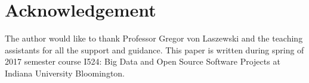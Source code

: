 \documentclass[9pt,twocolumn,twoside]{styles/osajnl}
\begin{document}
\section{Acknowledgement}
The author would like to thank Professor Gregor von Laszewski and the
teaching assistants for all the support and guidance. This paper is written during spring of 2017
semester course {I524: Big Data and Open Source Software Projects} at
Indiana University Bloomington.


\end{document}
